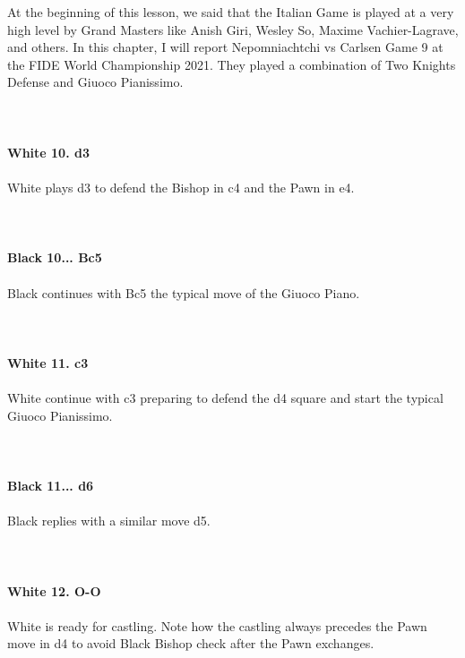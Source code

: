 \documentclass{article}
\begin{document}
At the beginning of this lesson, we said that the Italian Game is played at a very high level by Grand Masters like Anish Giri, Wesley So, Maxime Vachier-Lagrave, and others. In this chapter, I will report Nepomniachtchi vs Carlsen Game 9 at the FIDE World Championship 2021. They played a combination of Two Knights Defense and Giuoco Pianissimo.\\
\\

\\
\\
\textbf{White 10. d3}\\
\\
White plays d3 to defend the Bishop in c4 and the Pawn in e4.\\
\\

\\
\\
\textbf{Black 10... Bc5}\\
\\
Black continues with Bc5 the typical move of the Giuoco Piano.\\
\\

\\
\\
\textbf{White 11. c3}\\
\\
White continue with c3 preparing to defend the d4 square and start the typical Giuoco Pianissimo.\\
\\

\\
\\
\textbf{Black 11... d6}\\
\\
Black replies with a similar move d5.\\
\\

\\
\\
\textbf{White 12. O-O}\\
\\
White is ready for castling. Note how the castling always precedes the Pawn move in d4 to avoid Black Bishop check after the Pawn exchanges.\\
\\

\\
\end{document}
